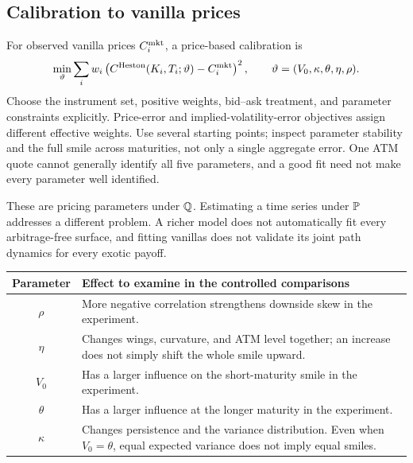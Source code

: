 \documentclass[10pt]{article}
\theoremstyle{definition}\newtheorem{definition}{Definition}[section]
\begin{document}
\subsection{Calibration to vanilla prices}
For observed vanilla prices \(C_i^{\rm mkt}\), a price-based calibration is
\[
\min_{\vartheta}\sum_iw_i
\left(C^{\rm Heston}(K_i,T_i;\vartheta)-C_i^{\rm mkt}\right)^2,
\qquad \vartheta=(V_0,\kappa,\theta,\eta,\rho).
\]
Choose the instrument set, positive weights, bid--ask treatment, and
parameter constraints explicitly. Price-error and implied-volatility-error
objectives assign different effective weights. Use several starting points;
inspect parameter stability and the full smile across maturities, not only
a single aggregate error. One ATM quote cannot generally identify all
five parameters, and a good fit need not make every parameter well identified.

These are pricing parameters under \(\mathbb Q\). Estimating a time series under
\(\mathbb P\) addresses a different problem. A richer model does not automatically
fit every arbitrage-free surface, and fitting vanillas does not validate
its joint path dynamics for every exotic payoff.

\begin{center}
\begin{tabular}{cL{.74\textwidth}}
\toprule Parameter & Effect to examine in the controlled comparisons\\\midrule
\(\rho\) & More negative correlation strengthens downside skew in the experiment.\\[.4em]
\(\eta\) & Changes wings, curvature, and ATM level together; an increase does not simply shift the whole smile upward.\\[.4em]
\(V_0\) & Has a larger influence on the short-maturity smile in the experiment.\\[.4em]
\(\theta\) & Has a larger influence at the longer maturity in the experiment.\\[.4em]
\(\kappa\) & Changes persistence and the variance distribution. Even when \(V_0=\theta\), equal expected variance does not imply equal smiles.\\
\bottomrule
\end{tabular}
\end{center}
\end{document}

